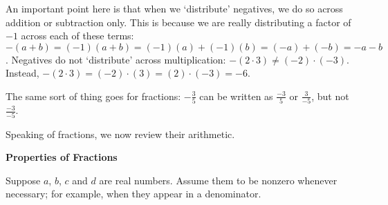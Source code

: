 \documentclass{ximera}
\begin{document}

\medskip

An important point here is that when we `distribute' negatives, we do so across addition or subtraction only.  This is because we are really distributing a factor of $-1$ across each of these terms:  $-(a+b) = (-1)(a+b) = (-1)(a) + (-1)(b) = (-a)+(-b) = -a-b$. Negatives do not `distribute' across multiplication:  $- (2 \cdot 3) \neq (-2)\cdot(-3)$. Instead, $-(2\cdot 3) = (-2)\cdot (3) = (2) \cdot (-3) = -6$.  

\medskip

The same sort of thing goes for fractions:  $- \frac{3}{5}$ can be written as $\frac{-3}{5}$ or $\frac{3}{-5}$, but not $\frac{-3}{-5}$.  

\pagebreak

Speaking of fractions, we now review their arithmetic.

\smallskip

\label{fractionarithmetic}


\centerline{\textbf{Properties of Fractions}}

Suppose $a$, $b$, $c$ and $d$ are real numbers.  Assume them to be nonzero whenever necessary; for example,  when they appear in a denominator.
\end{document}
